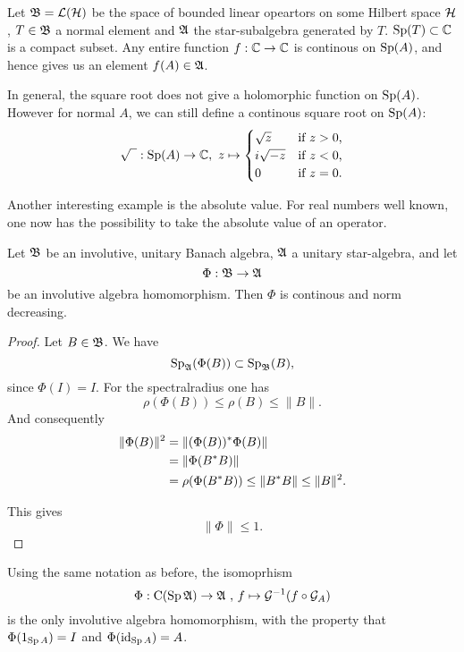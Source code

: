 \documentclass[a4paper,10pt]{article}
\begin{document}
\begin{expl}
 Let $\mathfrak{B} = \mathcal{L}(\mathcal{H})$ be the space of bounded linear opeartors on some Hilbert space $\mathcal{H}$, $T \in \mathfrak{B}$ a normal element and $\mathfrak{A}$ the star-subalgebra generated by $T$. $\operatorname{Sp} (T) \subset \mathbb{C}$ is a compact subset. Any entire function $f : \mathbb{C} \to \mathbb{C}$ is continous on $\operatorname{Sp} (A)$, and hence gives us an element $f(A) \in \mathfrak{A}$. 
 
 In general, the square root does not give a holomorphic function on $\operatorname{Sp} (A)$. However for normal $A$, we can still define a continous square root on $\operatorname{Sp} (A)$:
 \[
  \sqrt{\phantom{z}} : \operatorname{Sp} (A) \to \mathbb{C}, ~ z \mapsto 
  \begin{cases}
    \sqrt{z} 	& \text{if $z > 0$,} \\
    i \sqrt{-z}	& \text{if $ z < 0$,} \\
    0		& \text{if $ z = 0$.}
  \end{cases}
 \]

 Another interesting example is the absolute value. For real numbers well known, one now has the possibility to take the absolute value of an operator.
\end{expl}

\begin{prop}
 Let $\mathfrak{B}$ be an involutive, unitary Banach algebra, $\mathfrak{A}$ a unitary star-algebra, and let
\[
  \Phi : \mathfrak{B} \to \mathfrak{A} 
\]
be an involutive algebra homomorphism.
Then $\Phi$ is continous and norm decreasing.
\end{prop}
\begin{proof}
 Let $B \in \mathfrak{B}$. We have
\[
  \operatorname{Sp}_{\mathfrak{A}} (\Phi (B)) \subset \operatorname{Sp}_{\mathfrak{B}} (B),
\]
since $\Phi(I)=I$. For the spectralradius one has
\[
 \rho (\Phi (B)) \leq \rho ( B) \leq \| B \|.
\]
And consequently
\begin{align*}
 \| \Phi (B) \|^2 &= \| (\Phi (B))^{*} \Phi (B) \| \\
		  &= \| \Phi (B ^{*} B) \| \\
		  &= \rho ( \Phi(B ^{*} B)) \leq \| B^{*} B \| \leq \| B \| ^2.
\end{align*}

This gives 
\[
 \| \Phi \| \leq 1.
\]
\end{proof}
\begin{cor}
 Using the same notation as before, the isomoprhism
 \[
  \Phi : \operatorname{C} ( \operatorname{Sp} \mathfrak{A}) \to \mathfrak{A} \text{ , } f \mapsto \mathcal{G} ^{-1} (f \circ \mathcal{G}_A)
 \]
is the only involutive algebra homomorphism, with the property that \vspace{10 pt} $ \Phi ( 1_{\operatorname{Sp} A} ) =  I$  and $\Phi ( \operatorname{id} _{ \operatorname{Sp} A }) = A$.
 
\end{cor}
\end{document}
